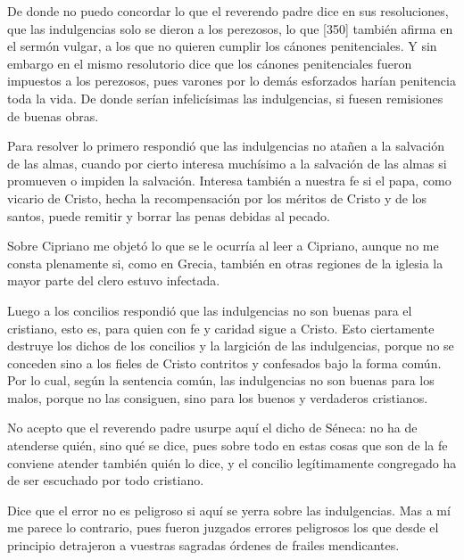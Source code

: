 De donde no puedo concordar lo que el reverendo padre dice en sus resoluciones, que las indulgencias solo se dieron a los perezosos, lo que [350] también afirma en el sermón vulgar, a los que no quieren cumplir los cánones penitenciales. Y sin embargo en el mismo resolutorio dice que los cánones penitenciales fueron impuestos a los perezosos, pues varones por lo demás esforzados harían penitencia toda la vida. De donde serían infelicísimas las indulgencias, si fuesen remisiones de buenas obras.

Para resolver lo primero respondió que las indulgencias no atañen a la salvación de las almas, cuando por cierto interesa muchísimo a la salvación de las almas si promueven o impiden la salvación. Interesa también a nuestra fe si el papa, como vicario de Cristo, hecha la recompensación por los méritos de Cristo y de los santos, puede remitir y borrar las penas debidas al pecado.

Sobre Cipriano me objetó lo que se le ocurría al leer a Cipriano, aunque no me consta plenamente si, como en Grecia, también en otras regiones de la iglesia la mayor parte del clero estuvo infectada.

Luego a los concilios respondió que las indulgencias no son buenas para el cristiano, esto es, para quien con fe y caridad sigue a Cristo. Esto ciertamente destruye los dichos de los concilios y la largición de las indulgencias, porque no se conceden sino a los fieles de Cristo contritos y confesados bajo la forma común. Por lo cual, según la sentencia común, las indulgencias no son buenas para los malos, porque no las consiguen, sino para los buenos y verdaderos cristianos.

No acepto que el reverendo padre usurpe aquí el dicho de Séneca: no ha de atenderse quién, sino qué se dice, pues sobre todo en estas cosas que son de la fe conviene atender también quién lo dice, y el concilio legítimamente congregado ha de ser escuchado por todo cristiano.

Dice que el error no es peligroso si aquí se yerra sobre las indulgencias. Mas a mí me parece lo contrario, pues fueron juzgados errores peligrosos los que desde el principio detrajeron a vuestras sagradas órdenes de frailes mendicantes.

